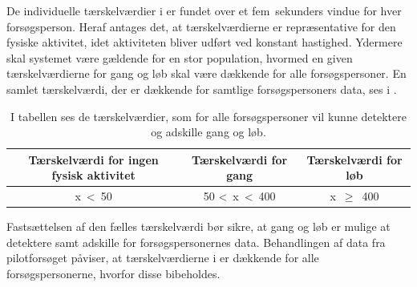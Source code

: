 De individuelle tærskelværdier i  er fundet over et fem~sekunders vindue for hver forsøgsperson. Heraf antages det, at tærskelværdierne er repræsentative for den fysiske aktivitet, idet aktiviteten bliver udført ved konstant hastighed. Ydermere skal systemet være gældende for en stor population, hvormed en given tærskelværdierne for gang og løb skal være dækkende for alle forsøgspersoner. En samlet tærskelværdi, der er dækkende for samtlige forsøgspersoners data, ses i .
\begin{table}[H]
	\centering
	\begin{tabular}{ccc}
		\hline
		\rowcolor[HTML]{C0C0C0} 
		Tærskelværdi for ingen fysisk aktivitet & Tærskelværdi for gang & Tærskelværdi for løb \\ \hline
		x~\textless~50 & 50 \textless~x~\textless~400 & x~$\geq$~400 \\ \hline
	\end{tabular}
	\caption{I tabellen ses de tærskelværdier, som for alle forsøgspersoner vil kunne detektere og adskille gang og løb.}
	\label{tab:faelles_taerskel}
\end{table}\vspace{-0.25cm}
Fastsættelsen af den fælles tærskelværdi bør sikre, at gang og løb er mulige at detektere samt adskille for forsøgspersonernes data. Behandlingen af data fra pilotforsøget påviser, at tærskelværdierne i  er dækkende for alle forsøgspersonerne, hvorfor disse bibeholdes.

